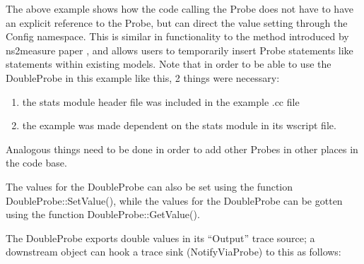 \documentclass[letterpaper,10pt,english]{sphinxmanual}
\begin{document}
The above example shows how the code calling the Probe does not have to
have an explicit reference to the Probe, but can direct the value
setting through the Config namespace.  This is similar in functionality
to the  method introduced by ns2measure paper , and allows
users to temporarily insert Probe statements like  statements within
existing  models.  Note that in order to be able to use the DoubleProbe in this example like this, 2 things were necessary:
\begin{enumerate}
%
\item {} 
the stats module header file was included in the example .cc file

\item {} 
the example was made dependent on the stats module in its wscript file.

\end{enumerate}

Analogous things need to be done in order to add other Probes in other places in the  code base.

The values for the DoubleProbe can also be set using the function
DoubleProbe::SetValue(), while the values for the DoubleProbe can be gotten
using the function DoubleProbe::GetValue().

The DoubleProbe exports double values in its “Output” trace source;
a downstream object can hook a trace sink (NotifyViaProbe) to this as follows:

\begin{sphinxVerbatim}[commandchars=\\\{\}]
       
\end{sphinxVerbatim}
\end{document}

